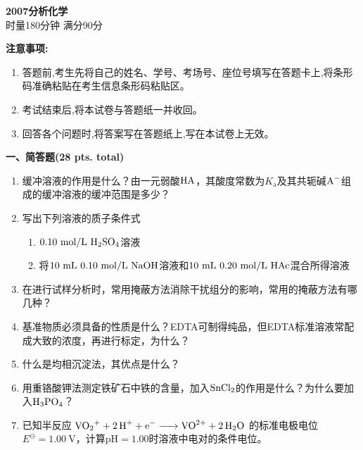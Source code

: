 \begin{center}
    {\LARGE \textbf{2007分析化学}} \\[2ex]
    {\large 时量180分钟 \quad 满分90分}
\end{center}

\vspace{0.5cm}
\noindent\textbf{注意事项:}
\begin{enumerate}[label=\arabic*., parsep=0pt, itemsep=0pt]
    \item 答题前,考生先将自己的姓名、学号、考场号、座位号填写在答题卡上,将条形码准确粘贴在考生信息条形码粘贴区。
    \item 考试结束后,将本试卷与答题纸一并收回。
    \item 回答各个问题时,将答案写在答题纸上,写在本试卷上无效。
\end{enumerate}

\vspace{0.5cm}
\noindent\textbf{一、简答题(28 pts. total)}

\begin{enumerate}[label=\arabic*., itemsep=1.5ex]
    \item 缓冲溶液的作用是什么？由一元弱酸$\ce{HA}$，其酸度常数为$K_\mathrm{a}$及其共轭碱$\ce{A^-}$组成的缓冲溶液的缓冲范围是多少？
    \item 写出下列溶液的质子条件式
    \begin{enumerate}[label=(\arabic*), noitemsep, topsep=0pt, partopsep=0pt]
        \item $0.10\ \mathrm{mol/L}\ \ce{H2SO4}$溶液
        \item 将$10\ \mathrm{mL}\ 0.10\ \mathrm{mol/L}\ \ce{NaOH}$溶液和$10\ \mathrm{mL}\ 0.20\ \mathrm{mol/L}\ \ce{HAc}$混合所得溶液
    \end{enumerate}
    \item 在进行试样分析时，常用掩蔽方法消除干扰组分的影响，常用的掩蔽方法有哪几种？
    \item 基准物质必须具备的性质是什么？EDTA可制得纯品，但EDTA标准溶液常配成大致的浓度，再进行标定，为什么？
    \item 什么是均相沉淀法，其优点是什么？
    \item 用重铬酸钾法测定铁矿石中铁的含量，加入$\ce{SnCl2}$的作用是什么？为什么要加入$\ce{H3PO4}$？
    \item 已知半反应 $\ce{VO2^+ + 2H^+ + e^- -> VO^{2+} + 2H2O}$ 的标准电极电位$E^\ominus=1.00\ \mathrm{V}$，计算$\mathrm{pH}=1.00$时溶液中电对的条件电位。
\end{enumerate}

